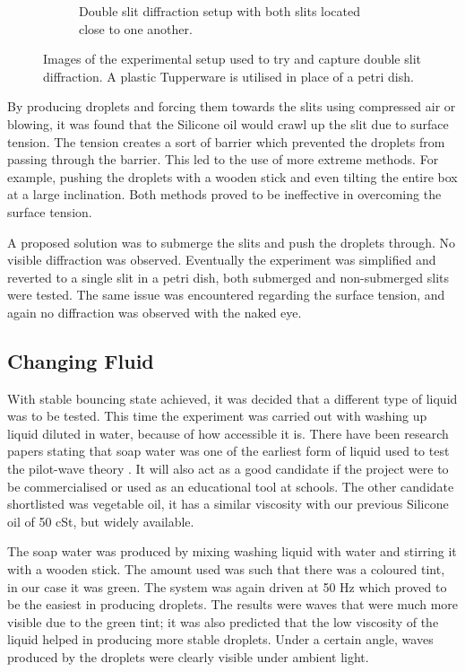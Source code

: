 \begin{figure}[h]
\begin{subfigure}{0.475\textwidth}
        \caption{Double slit diffraction setup with both slits located close to one another.}
    \end{subfigure}
\caption{Images of the experimental setup used to try and capture double slit diffraction. A plastic Tupperware is utilised in place of a petri dish. }
\label{fig:double_slit_setup}
\end{figure}

By producing droplets and forcing them towards the slits using compressed air or blowing, it was found that the Silicone oil would crawl up the slit due to surface tension. The tension creates a sort of barrier which prevented the droplets from passing through the barrier. This led to the use of more extreme methods. For example, pushing the droplets with a wooden stick and even tilting the entire box at a large inclination. Both methods proved to be ineffective in overcoming the surface tension.

A proposed solution was to submerge the slits and push the droplets through. No visible diffraction was observed. Eventually the experiment was simplified and reverted to a single slit in a petri dish, both submerged and non-submerged slits were tested. The same issue was encountered regarding the surface tension, and again no diffraction was observed with the naked eye.

\subsection{Changing Fluid}
With stable bouncing state achieved, it was decided that a different type of liquid was to be tested. This time the experiment was carried out with washing up liquid diluted in water, because of how accessible it is. There have been research papers stating that soap water was one of the earliest form of liquid used to test the pilot-wave theory \cite{protiere2006particle}. It will also act as a good candidate if the project were to be commercialised or used as an educational tool at schools. The other candidate shortlisted was vegetable oil, it has a similar viscosity with our previous Silicone oil of 50 cSt, but widely available.

The soap water was produced by mixing washing liquid with water and stirring it with a wooden stick. The amount used was such that there was a coloured tint, in our case it was green. The system was again driven at 50 Hz which proved to be the easiest in producing droplets. The results were waves that were much more visible due to the green tint; it was also predicted that the low viscosity of the liquid helped in producing more stable droplets. Under a certain angle, waves produced by the droplets were clearly visible under ambient light.

